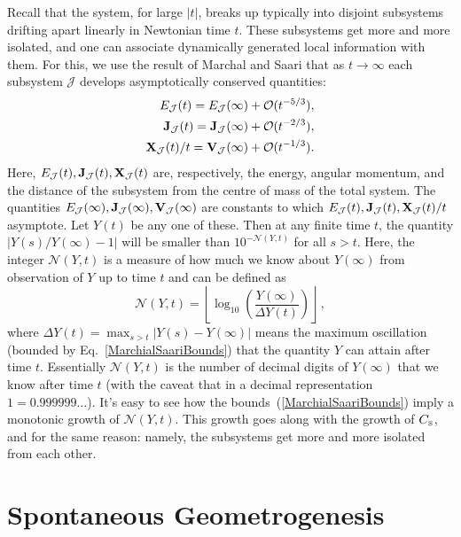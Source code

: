 \documentclass[prl,nofootinbib,twocolumn,superscriptaddress]{revtex4}
\newcommand{\st}[1]{\text{\tiny \rm #1}}
\begin{document}
Recall that the system, for large $|t|$, breaks up typically into disjoint subsystems  drifting apart linearly in Newtonian time $t$. These subsystems get more and more
isolated, and one can associate dynamically generated local information with them.
For this, we use the result of Marchal and Saari \cite{Marchial:1976fi} that as $t\rightarrow \infty$ each subsystem $\mathcal J$ develops asymptotically
conserved quantities:
\begin{equation}\label{MarchialSaariBounds}
\begin{aligned}
E_{\mathcal J} (t) = E_{\mathcal J}(\infty) + \mathcal O(t^{- 5/3}) ,\\
{\bf J}_{\mathcal J} (t) = {\bf J}_{\mathcal J}(\infty) + \mathcal O(t^{- 2/3}) , \\
{\bf X}_{\mathcal J} (t) / t = {\bf V}_{\mathcal J}(\infty) + \mathcal O(t^{-1/3}).
\end{aligned}
\end{equation}
Here, $E_{\mathcal J}(t), {\bf J}_{\mathcal J} (t) ,{\bf X}_{\mathcal J} (t)$ are, respectively,
the energy, angular momentum, and the distance of the subsystem from the
centre of mass of the total system. The quantities $E_{\mathcal J}(\infty), {\bf J}_{\mathcal J} (\infty) ,{\bf V}_{\mathcal J} (\infty)$ are constants to which $E_{\mathcal J}(t), {\bf J}_{\mathcal J} (t) ,{\bf X}_{\mathcal J} (t)/t$ asymptote.  Let $Y(t)$ be any one of these. Then at any finite time $t$,  the quantity $\left|Y(s)/Y(\infty) -1\right|$ will be smaller than $10^{-\mathcal N (Y,t)}$ for all $s >t$. Here, the integer $\mathcal N (Y,t)$ is a measure of 
how much we know about $Y(\infty)$ from observation of $Y$ up to time $t$ and can be defined as
\begin{equation}
\mathcal N (Y,t) = \left\lfloor \log_{10} \left( \frac {Y(\infty)}{\Delta Y(t)} \right) \right\rfloor \,,
\end{equation}
where $\Delta Y(t) = \max_{s>t}|Y(s)-Y(\infty)|$ means the maximum oscillation (bounded by Eq.~\ref{MarchialSaariBounds}) that the quantity $Y$ can attain after time $t$. Essentially $\mathcal N (Y,t)$ is the number of decimal digits of $Y(\infty)$ that 
we know after time $t$ (with the caveat that in a decimal representation $1 = 0.999999\dots$). It's easy to see how the bounds~(\ref{MarchialSaariBounds}) imply a monotonic
growth of $\mathcal N (Y,t) $. This growth goes along with the growth of $C_\st{S}$, and for the same reason: namely, the subsystems get more and more isolated from each other.

\section{Spontaneous Geometrogenesis}
\end{document}

